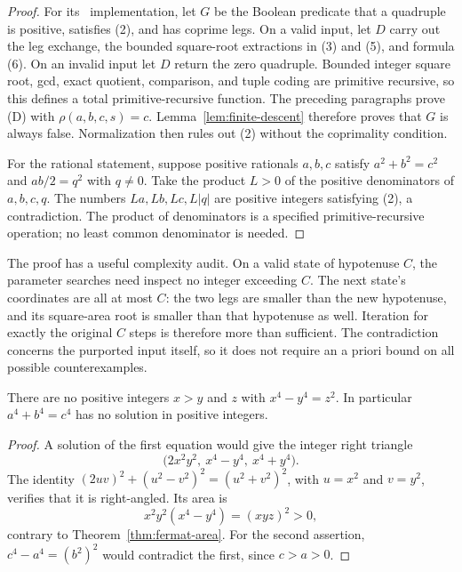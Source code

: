 \begin{proof}
For its \iPRA\ implementation, let $G$ be the Boolean predicate that a
quadruple is positive, satisfies (2), and has coprime legs.  On a valid input,
let $D$ carry out the leg exchange, the bounded square-root extractions in
(3) and (5), and formula (6).  On an invalid input let $D$ return the zero
quadruple.  Bounded integer square root, gcd, exact quotient, comparison,
and tuple coding are primitive recursive, so this defines a total
primitive-recursive function.  The preceding paragraphs prove (D) with
$\rho(a,b,c,s)=c$.  Lemma~\ref{lem:finite-descent} therefore proves that
$G$ is always false.  Normalization then rules out (2) without the
coprimality condition.

For the rational statement, suppose positive rationals $a,b,c$ satisfy
$a^2+b^2=c^2$ and $ab/2=q^2$ with $q\ne0$.  Take the product $L>0$ of the
positive denominators of $a,b,c,q$.  The numbers
$La,Lb,Lc,L|q|$ are positive integers satisfying (2), a contradiction.
The product of denominators is a specified primitive-recursive operation;
no least common denominator is needed.
\end{proof}

The proof has a useful complexity audit.  On a valid state of hypotenuse
$C$, the parameter searches need inspect no integer exceeding $C$.
The next state's coordinates are all at most $C$: the two legs are smaller
than the new hypotenuse, and its square-area root is smaller than that
hypotenuse as well.  Iteration for exactly the original $C$ steps is
therefore more than sufficient.  The contradiction concerns the purported
input itself, so it does not require an a priori bound on all possible
counterexamples.

\begin{corollary}\label{cor:quartic-obstruction}
There are no positive integers $x>y$ and $z$ with $x^4-y^4=z^2$.
In particular $a^4+b^4=c^4$ has no solution in positive integers.
\end{corollary}

\begin{proof}
A solution of the first equation would give the integer right triangle
\[
 \bigl(2x^2y^2,\ x^4-y^4,\ x^4+y^4\bigr).
\]
The identity $(2uv)^2+(u^2-v^2)^2=(u^2+v^2)^2$, with $u=x^2$ and
$v=y^2$, verifies that it is right-angled.  Its area is
\[
 x^2y^2(x^4-y^4)=(xyz)^2>0,
\]
contrary to Theorem~\ref{thm:fermat-area}.  For the second assertion,
$c^4-a^4=(b^2)^2$ would contradict the first, since $c>a>0$.
\end{proof}

